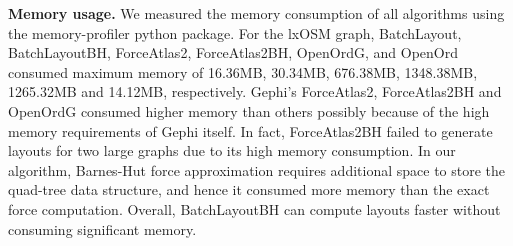 \documentclass{vgtc}
\newcommand*{\myfont}{\fontfamily{lmtt}\selectfont}
\newcommand{\toolname}{{BatchLayout}}
\newcommand{\toolnameBH}{{BatchLayoutBH}}
\begin{document}
{\bf Memory usage.} We measured the memory consumption of all algorithms using the {\myfont memory-profiler} python package.
For the lxOSM graph, \toolname{}, \toolnameBH{}, ForceAtlas2, ForceAtlas2BH, OpenOrdG, and OpenOrd consumed maximum memory of 16.36MB, 30.34MB, 676.38MB, 1348.38MB, 1265.32MB and 14.12MB, respectively. 
Gephi's ForceAtlas2, ForceAtlas2BH and OpenOrdG consumed higher memory than others possibly because of the high memory requirements of Gephi itself.
In fact, ForceAtlas2BH failed to generate layouts for two large graphs due to its high memory consumption.
In our algorithm, Barnes-Hut force approximation requires additional space to store the quad-tree data structure, and hence it consumed more memory than the exact force computation. 
Overall, \toolnameBH{} can compute layouts faster without consuming significant memory. 


\end{document}
